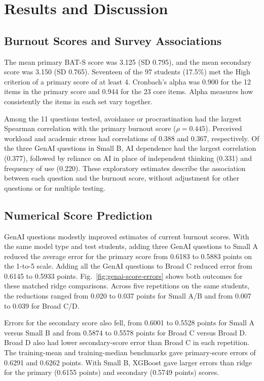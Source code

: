 \section{Results and Discussion}
\label{sec:results-and-discussion}

\subsection{Burnout Scores and Survey Associations}

The mean primary BAT-S score was 3.125 (SD 0.795), and the mean secondary score was 3.150 (SD 0.765). Seventeen of the 97 students (17.5\%) met the High criterion of a primary score of at least 4. Cronbach's alpha was 0.900 for the 12 items in the primary score and 0.944 for the 23 core items. Alpha measures how consistently the items in each set vary together.

Among the 11 questions tested, avoidance or procrastination had the largest Spearman correlation with the primary burnout score (\(\rho=0.445\)). Perceived workload and academic stress had correlations of 0.388 and 0.367, respectively. Of the three GenAI questions in Small B, AI dependence had the largest correlation (0.377), followed by reliance on AI in place of independent thinking (0.331) and frequency of use (0.220). These exploratory estimates describe the association between each question and the burnout score, without adjustment for other questions or for multiple testing.

\subsection{Numerical Score Prediction}

GenAI questions modestly improved estimates of current burnout scores. With the same model type and test students, adding three GenAI questions to Small A reduced the average error for the primary score from 0.6183 to 0.5883 points on the 1-to-5 scale. Adding all the GenAI questions to Broad C reduced error from 0.6145 to 0.5933 points. Fig.~\ref{fig:genai-score-errors} shows both outcomes for these matched ridge comparisons. Across five repetitions on the same students, the reductions ranged from 0.020 to 0.037 points for Small A/B and from 0.007 to 0.039 for Broad C/D.

Errors for the secondary score also fell, from 0.6001 to 0.5528 points for Small A versus Small B and from 0.5874 to 0.5578 points for Broad C versus Broad D. Broad D also had lower secondary-score error than Broad C in each repetition. The training-mean and training-median benchmarks gave primary-score errors of 0.6291 and 0.6262 points. With Small B, XGBoost gave larger errors than ridge for the primary (0.6155 points) and secondary (0.5749 points) scores.

